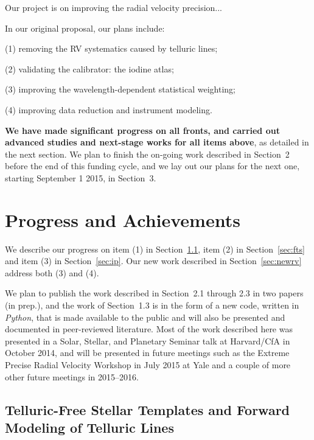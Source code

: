 \documentclass[12pt]{article}
\begin{document}
Our project is on improving the radial velocity precision...

In our original proposal, our plans include:

(1) removing the RV systematics caused by telluric lines;

(2) validating the calibrator: the iodine atlas;

(3) improving the wavelength-dependent statistical weighting;

(4) improving data reduction and instrument modeling.

{\bf We have made significant progress on all fronts, and carried out
  advanced studies and next-stage works for all items above}, as
detailed in the next section. We plan to finish the on-going work
described in Section~2 before the end of this funding cycle, and we
lay out our plans for the next one, starting September 1 2015, in
Section~3.


\vspace{-10pt}
\section{Progress and Achievements}
\vspace{-5pt}

We describe our progress on item (1) in Section~\ref{sec:tell}, item
(2) in Section~\ref{sec:fts} and item (3) in Section~\ref{sec:ip}. Our
new work described in Section~\ref{sec:newrv} address both (3) and
(4).

We plan to publish the work described in Section~2.1 through 2.3 in
two papers (in prep.), and the work of Section~1.3 is in the form of a
new code, written in {\it Python}, that is made available to the
public and will also be presented and documented in peer-reviewed
literature. Most of the work described here was presented in a Solar,
Stellar, and Planetary Seminar talk at Harvard/CfA in October 2014,
and will be presented in future meetings such as the Extreme Precise
Radial Velocity Workshop in July 2015 at Yale and a couple of more
other future meetings in 2015--2016.


\vspace{-10pt}
\subsection{Telluric-Free Stellar Templates and Forward Modeling of
  Telluric Lines}\label{sec:tell}
\vspace{-5pt}
\end{document}
